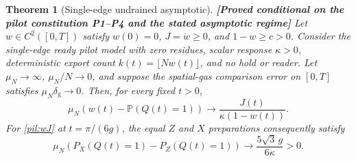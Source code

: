 \documentclass[11pt,a4paper]{article}
\newtheorem{theorem}{Theorem}[section]
\theoremstyle{definition}
\theoremstyle{remark}\newtheorem{remark}[theorem]{Remark}
\newcommand{\status}[1]{\textbf{[#1]}\quad}
\begin{document}
\begin{theorem}[Single-edge undrained asymptotic]\label{pil:undrained}
\status{Proved conditional on the pilot constitution P1--P4 and the stated asymptotic regime}
Let $w\in C^2([0,T])$ satisfy $w(0)=0$, $J=\dot w\ge0$, and $1-w\ge c>0$. Consider the single-edge ready pilot model with zero residues, scalar response $\kappa>0$, deterministic export count $k(t)=\lfloor Nw(t)\rfloor$, and no hold or reader. Let $\mu_N\to\infty$, $\mu_N/N\to0$, and suppose the spatial-gas comparison error on $[0,T]$ satisfies $\mu_N\delta_{\mathrm g}\to0$. Then, for every fixed $t>0$,
\begin{equation}\label{pil:undrainedlimit}
 \mu_N\left(w(t)-\mathbb P(Q(t)=1)\right)
       \longrightarrow\frac{J(t)}{\kappa(1-w(t))}.
\end{equation}
For \eqref{pil:wJ} at $t=\pi/(6g)$, the equal $Z$ and $X$ preparations consequently satisfy
\begin{equation}\label{pil:undrainedgap}
 \mu_N(P_X(Q(t)=1)-P_Z(Q(t)=1))
       \longrightarrow\frac{5\sqrt3\,g}{6\kappa}>0.
\end{equation}
\end{theorem}
\end{document}
